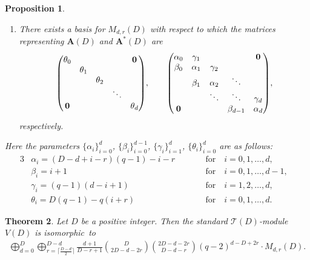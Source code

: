 \documentclass[pdftex]{sigma}%
\def\A{\mathbf A}
\def\T{\mathcal T}
\numberwithin{equation}{section}
\newtheorem{Theorem}{Theorem}[section]
\newtheorem{Proposition}[Theorem]{Proposition}
 { \theoremstyle{definition}
\newtheorem{Definition}[Theorem]{Definition}
\newtheorem{Note}[Theorem]{Note}
\newtheorem{Example}[Theorem]{Example}
\newtheorem{Remark}[Theorem]{Remark} }
\begin{document}
\begin{Proposition}
\begin{enumerate}
\item[$(ii)$] There exists a basis for $M_{d,r}(D)$ with respect to which the matrices representing $\A(D)$ and $\A^*(D)$ are
\begin{gather*}
\begin{pmatrix}
\theta_0 & & & &{\bf 0}
\\
 &\theta_1
\\
 & &\theta_2
 \\
 & & &\ddots
 \\
{\bf 0} & & & &\theta_d
\end{pmatrix}\!,
\qquad
\begin{pmatrix}
\alpha_0 &\gamma_1 & & &{\bf 0}
\\
\beta_0 &\alpha_1 &\gamma_2
\\
&\beta_1 &\alpha_2 &\ddots
 \\
& &\ddots &\ddots &\gamma_d
 \\
{\bf 0} & & &\beta_{d-1} &\alpha_d
\end{pmatrix}\!,
\end{gather*}
respectively.
\end{enumerate}
Here the parameters $\{\alpha_i\}_{i=0}^d$,
$\{\beta_i\}_{i=0}^{d-1}$, $\{\gamma_i\}_{i=1}^d$, $\{\theta_i\}_{i=0}^d$ are as follows:
\begin{alignat*}{3}
&\alpha_i=(D-d+i-r)(q-1)-i-r\qquad
&&\text{for}\quad i=0,1,\dots,d,&
\\
&\beta_i=i+1\qquad
&&\text{for}\quad i=0,1,\dots,d-1,&
\\
&\gamma_i=(q-1)(d-i+1)\qquad
&&\text{for}\quad i=1,2,\dots,d,&
\\
&\theta_i=D(q-1)-q(i+r)\qquad
&&\text{for}\quad i=0,1,\dots,d.&
\end{alignat*}
\end{Proposition}

\begin{Theorem}\label{thm2:dec_T(D)module}
Let $D$ be a positive integer. Then the standard $\T(D)$-module $V(D)$ is isomorphic~to
\begin{gather*}
\bigoplus_{d=0}^D
\bigoplus_{r=\lceil \frac{D-d}{2}\rceil}^{D-d}
\frac{d+1}{D-r+1}{D\choose 2D-d-2r}{2D-d-2r\choose D-d-r}
(q-2)^{d-D+2r}\cdot M_{d,r}(D).
\end{gather*}
\end{Theorem}
\end{document}
